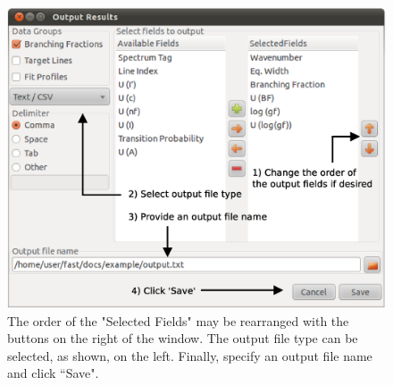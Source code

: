 \documentclass[a4paper,12pt]{report}
\begin{document}
\begin{figure}\centering
\includegraphics[scale=0.45]{Tutorial16.eps}
\caption{The order of the "Selected Fields" may be rearranged with the buttons on the right of the window. The output file type can be selected, as shown, on the left. Finally, specify an output file name and click ``Save".}
\label{fig:tut16}
\end{figure}
\end{document}
